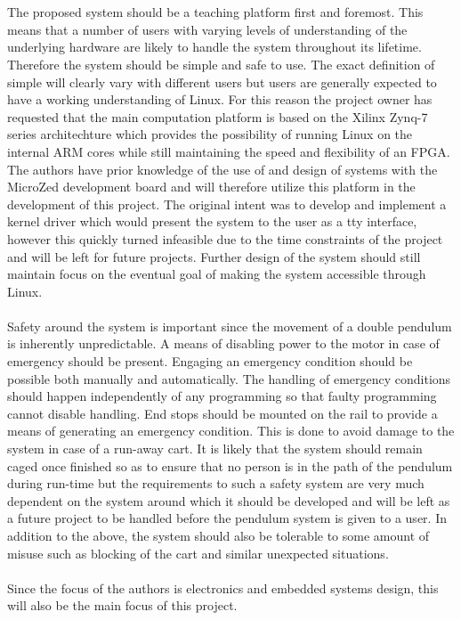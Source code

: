 \\~\\
The proposed system should be a teaching platform first and foremost.
This means that a number of users with varying levels of understanding of the underlying hardware are likely to handle the system throughout its lifetime.
Therefore the system should be simple and safe to use.
The exact definition of simple will clearly vary with different users but users are generally expected to have a working understanding of Linux.
For this reason the project owner has requested that the main computation platform is based on the Xilinx Zynq-7 series architechture which provides the possibility of running Linux on the internal ARM cores while still maintaining the speed and flexibility of an FPGA.
The authors have prior knowledge of the use of and design of systems with the MicroZed development board and will therefore utilize this platform in the development of this project. 
The original intent was to develop and implement a kernel driver which would present the system to the user as a tty interface, however this quickly turned infeasible due to the time constraints of the project and will be left for future projects.
Further design of the system should still maintain focus on the eventual goal of making the system accessible through Linux.
\\~\\
Safety around the system is important since the movement of a double pendulum is inherently unpredictable.
A means of disabling power to the motor in case of emergency should be present.  
Engaging an emergency condition should be possible both manually and automatically.
The handling of emergency conditions should happen independently of any programming so that faulty programming cannot disable handling.
End stops should be mounted on the rail to provide a means of generating an emergency condition.
This is done to avoid damage to the system in case of a run-away cart.
It is likely that the system should remain caged once finished so as to ensure that no person is in the path of the pendulum during run-time but the requirements to such a safety system are very much dependent on the system around which it should be developed and will be left as a future project to be handled before the pendulum system is given to a user.
In addition to the above, the system should also be tolerable to some amount of misuse such as blocking of the cart and similar unexpected situations.
\\~\\
Since the focus of the authors is electronics and embedded systems design, this will also be the main focus of this project.
